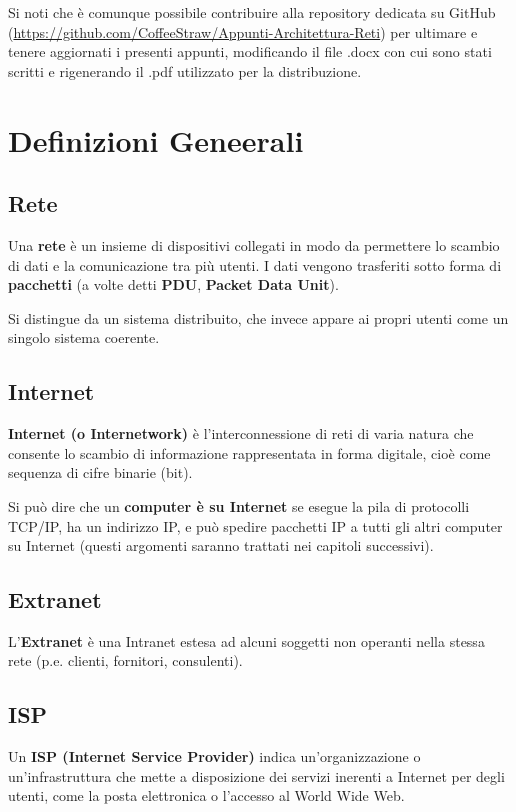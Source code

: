\documentclass{article}
\begin{document}
    Si noti che è comunque possibile contribuire alla repository dedicata su GitHub
    (\url{https://github.com/CoffeeStraw/Appunti-Architettura-Reti}) per ultimare e tenere aggiornati
    i presenti appunti, modificando il file .docx con cui sono stati scritti e rigenerando il .pdf
    utilizzato per la distribuzione.

    \tableofcontents

    \section{Definizioni Geneerali}
        \subsection{Rete}
        Una \textbf{rete} è un insieme di dispositivi collegati in modo da permettere lo scambio di dati e la
        comunicazione tra più utenti. I dati vengono trasferiti sotto forma di \textbf{pacchetti} (a volte detti
        \textbf{PDU}, \textbf{Packet Data Unit}).\newline
        
        Si distingue da un sistema distribuito, che invece appare ai propri utenti come un singolo
        sistema coerente.

        \subsection{Internet}
        \textbf{Internet (o Internetwork)} è l’interconnessione di reti di varia natura che consente lo scambio
        di informazione rappresentata in forma digitale, cioè come sequenza di cifre binarie (bit).\newline

        Si può dire che un \textbf{computer è su Internet} se esegue la pila di protocolli TCP/IP, ha un indirizzo
        IP, e può spedire pacchetti IP a tutti gli altri computer su Internet (questi argomenti saranno
        trattati nei capitoli successivi).

        \subsection{Extranet}
        L’\textbf{Extranet} è una Intranet estesa ad alcuni soggetti non operanti nella stessa rete (p.e. clienti,
        fornitori, consulenti).

        \subsection{ISP}
        Un \textbf{ISP (Internet Service Provider)} indica un’organizzazione o un’infrastruttura che mette a
        disposizione dei servizi inerenti a Internet per degli utenti, come la posta elettronica o l’accesso
        al World Wide Web.
\end{document}
